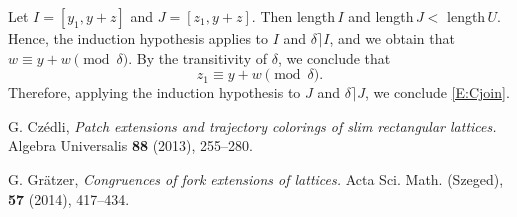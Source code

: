 \documentclass{amsart}
\begin{document}
Let $I=[y_1,y+ z]$ and $J=[z_1,y+ z]$. 
Then length\,$I$ and length\,$J  < $ length\,$U$. 
Hence, the induction hypothesis applies to $I$ 
and $\delta\rceil I$, and we obtain that 
$w \equiv y+ w \pmod{\delta}$. 
By the transitivity of $\delta$, we conclude that 
\begin{equation}\label{E:three}%
z_1 \equiv y+ w \pmod{\delta}.
\end{equation}
Therefore, applying the induction hypothesis to $J$ 
and $\delta \rceil J$, we conclude \eqref{E:Cjoin}.

\begin{thebibliography}{9}
G. Cz\'edli,
\emph{Patch extensions and trajectory colorings of slim
rectangular lattices.}
Algebra Universalis \textbf{88} (2013), 255--280. 

G. Gr\"atzer, 
\emph{Congruences of fork extensions of lattices.}
Acta Sci. Math. (Szeged), \textbf{57} (2014), 417--434. 
\end{thebibliography}
\end{document}
